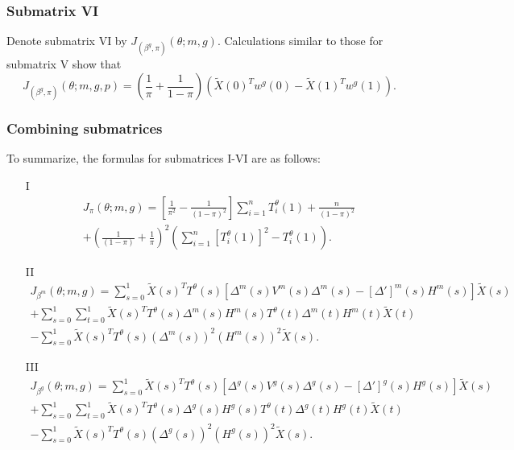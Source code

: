\documentclass[12pt]{article}
\begin{document}
\begin{appendices}
\subsubsection*{Submatrix VI}
Denote submatrix VI by $J_{(\beta^g,\pi)}(\theta; m, g).$ Calculations similar to those for submatrix V show that
\begin{equation}\label{sub_mat_6_formula} J_{(\beta^g, \pi)}(\theta; m, g, p) = \left(\frac{1}{\pi} + \frac{1}{1 - \pi} \right) \left( \tilde{X}(0)^T w^g(0) - \tilde{X}(1)^T w^g(1)\right). \end{equation}

\subsubsection*{Combining submatrices}
To summarize, the formulas for submatrices I-VI are as follows:
\begin{itemize}
\item[I]\begin{multline*}
J_\pi(\theta; m, g) = 
\left[ \frac{1}{\pi^2} - \frac{1}{(1 - \pi )^2} \right] \sum_{i=1}^n T^\theta_i(1) + \frac{n}{(1-\pi )^2} \\ + \left( \frac{1}{(1 - \pi )} + \frac{1}{\pi} \right)^2 \left( \sum_{i=1}^n [T^\theta_i(1)]^2 - T^\theta_i(1) \right).
\end{multline*}
\item[II] \begin{multline*}
J_{\beta^m}(\theta; m, g) = \sum_{s=0}^1 \tilde{X}(s)^T T^{\theta}(s) \left[ {\Delta}^m(s) {V}^m(s) {\Delta}^m(s) - [{\Delta}']^m(s) {H}^m(s) \right] \tilde{X}(s) \\ + \sum_{s=0}^1 \sum_{t=0}^1 \tilde{X}(s)^T {T}^\theta(s) {\Delta}^m(s) {H}^m(s) {T}^\theta(t) {\Delta}^m(t) {H}^m(t) \tilde{X}(t) \\ - \sum_{s=0}^1 \tilde{X}(s)^T T^{\theta}(s) ({\Delta}^m(s))^2 ({H}^m(s))^2 \tilde{X}(s).
\end{multline*}
\item[III] \begin{multline*}
J_{\beta^g}(\theta; m, g) = \sum_{s=0}^1 \tilde{X}(s)^T T^{\theta}(s) \left[{\Delta}^g(s) {V}^g(s) {\Delta}^g(s) - [{\Delta}']^g(s) {H}^g(s) \right] \tilde{X}(s) \\ + \sum_{s=0}^1 \sum_{t=0}^1 \tilde{X}(s)^T {T}^\theta(s) {\Delta}^g(s) {H}^g(s) {T}^\theta(t) {\Delta}^g(t) {H}^g(t) \tilde{X}(t) \\ - \sum_{s=0}^1 \tilde{X}(s)^T T^{\theta}(s) ({\Delta}^g(s))^2 ({H}^g(s))^2 \tilde{X}(s).

\end{multline*}
\end{itemize}
\end{appendices}
\end{document}

